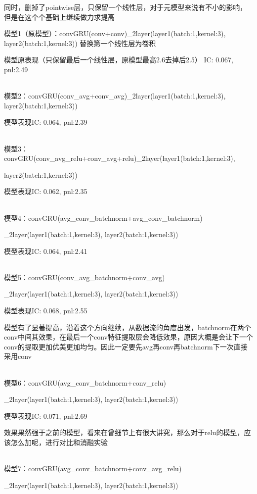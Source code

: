 \documentclass[11pt]{ctexart}
\begin{document}
同时，删掉了pointwise层，只保留一个线性层，对于元模型来说有不小的影响，但是在这个个基础上继续做力求提高

模型1（原模型）：convGRU(conv+conv)\_2layer(layer1(batch:1,kernel:3), layer2(batch:1,kernel:3)) 替换第一个线性层为卷积

模型原表现（只保留最后一个线性层，原模型最高2.6去掉后2.5）
{\kaishu \small IC: 0.067, pnl:2.49}

~\\
模型2：convGRU(conv\_avg+conv\_avg)\_2layer(layer1(batch:1,kernel:3), layer2(batch:1,kernel:3))

模型表现{\kaishu \small IC: 0.064, pnl:2.39}

~\\
模型3：convGRU(conv\_avg\_relu+conv\_avg+relu)\_2layer(layer1(batch:1,kernel:3), 

layer2(batch:1,kernel:3))

模型表现{\kaishu \small IC: 0.062, pnl:2.35}


~\\
模型4：convGRU(avg\_conv\_batchnorm+avg\_conv\_batchnorm)

\_2layer(layer1(batch:1,kernel:3), layer2(batch:1,kernel:3))

模型表现{\kaishu \small IC: 0.064, pnl:2.41}

~\\
模型5：convGRU(conv\_avg\_batchnorm+conv\_avg)

\_2layer(layer1(batch:1,kernel:3), layer2(batch:1,kernel:3))

模型表现{\kaishu \small IC: 0.068, pnl:2.55}

模型有了显著提高，沿着这个方向继续，从数据流的角度出发，batchnorm在两个conv中间其效果，在最后一个conv特征提取层会降低效果，原因大概是会让下一个conv的提取更加优美更加均匀。因此一定要先avg再conv再batchnorm下一次直接采用conv

~\\
模型6：convGRU(avg\_conv\_batchnorm+conv\_relu)

\_2layer(layer1(batch:1,kernel:3), layer2(batch:1,kernel:3))

模型表现{\kaishu \small IC: 0.071, pnl:2.69}

效果果然强于之前的模型，看来在曾细节上有很大讲究，那么对于relu的模型，应该怎么加呢，进行对比和消融实验

~\\
模型7：convGRU(avg\_conv\_batchnorm+conv\_avg\_relu)

\_2layer(layer1(batch:1,kernel:3), layer2(batch:1,kernel:3))
\end{document}
